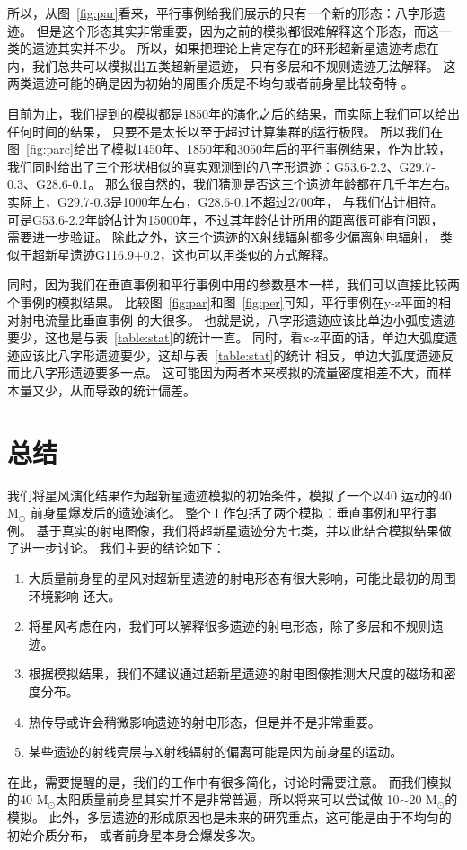 所以，从图~\ref{fig:par}看来，平行事例给我们展示的只有一个新的形态：八字形遗迹。
但是这个形态其实非常重要，因为之前的模拟都很难解释这个形态，而这一类的遗迹其实并不少。
所以，如果把理论上肯定存在的环形超新星遗迹考虑在内，我们总共可以模拟出五类超新星遗迹，
只有多层和不规则遗迹无法解释。
这两类遗迹可能的确是因为初始的周围介质是不均匀或者前身星比较奇特
\citep{Orlando2007,Orlando2017}。

目前为止，我们提到的模拟都是1850年的演化之后的结果，而实际上我们可以给出任何时间的结果，
只要不是太长以至于超过计算集群的运行极限。
所以我们在图~\ref{fig:parc}给出了模拟1450年、1850年和3050年后的平行事例结果，作为比较，
我们同时给出了三个形状相似的真实观测到的八字形遗迹：G53.6-2.2、G29.7-0.3、G28.6-0.1。
那么很自然的，我们猜测是否这三个遗迹年龄都在几千年左右。
实际上，G29.7-0.3是1000年左右\citep{Leahy2008}，G28.6-0.1不超过2700年\citep{Bamba2001}，
与我们估计相符。
可是G53.6-2.2年龄估计为15000年\citet{Long1991}，不过其年龄估计所用的距离很可能有问题，
需要进一步验证。
除此之外，这三个遗迹的X射线辐射都多少偏离射电辐射\citep{Broersen2015,Su2009,Bamba2001}，
类似于超新星遗迹G116.9+0.2，这也可以用类似的方式解释。

同时，因为我们在垂直事例和平行事例中用的参数基本一样，我们可以直接比较两个事例的模拟结果。
比较图~\ref{fig:par}和图~\ref{fig:per}可知，平行事例在y-z平面的相对射电流量比垂直事例
的大很多。
也就是说，八字形遗迹应该比单边小弧度遗迹要少，这也是与表~\ref{table:stat}的统计一直。
同时，看x-z平面的话，单边大弧度遗迹应该比八字形遗迹要少，这却与表~\ref{table:stat}的统计
相反，单边大弧度遗迹反而比八字形遗迹要多一点。
这可能因为两者本来模拟的流量密度相差不大，而样本量又少，从而导致的统计偏差。

\section{总结}
\label{SWsum}
我们将星风演化结果作为超新星遗迹模拟的初始条件，模拟了一个以40 \kms 运动的40 M$_{\odot}$
前身星爆发后的遗迹演化。
整个工作包括了两个模拟：垂直事例和平行事例。
基于真实的射电图像，我们将超新星遗迹分为七类，并以此结合模拟结果做了进一步讨论。
我们主要的结论如下：

\begin{enumerate}

    \item 大质量前身星的星风对超新星遗迹的射电形态有很大影响，可能比最初的周围环境影响
    还大。

    \item 将星风考虑在内，我们可以解释很多遗迹的射电形态，除了多层和不规则遗迹。

    \item 根据模拟结果，我们不建议通过超新星遗迹的射电图像推测大尺度的磁场和密度分布。

    \item 热传导或许会稍微影响遗迹的射电形态，但是并不是非常重要。

    \item 某些遗迹的射线壳层与X射线辐射的偏离可能是因为前身星的运动。

\end{enumerate}

在此，需要提醒的是，我们的工作中有很多简化，讨论时需要注意。
而我们模拟的40 M$_{\odot}$太阳质量前身星其实并不是非常普遍，所以将来可以尝试做
10$\sim$20 M$_{\odot}$的模拟。
此外，多层遗迹的形成原因也是未来的研究重点，这可能是由于不均匀的初始介质分布，
或者前身星本身会爆发多次。
